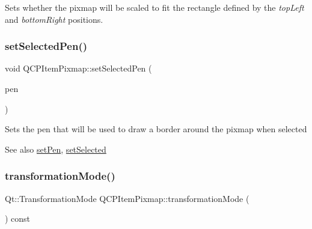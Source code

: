 Sets whether the pixmap will be scaled to fit the rectangle defined by the {\itshape top\+Left} and {\itshape bottom\+Right} positions. \mbox{\label{class_q_c_p_item_pixmap_afc5e479e88e53740176ce77cb70dd67a}} 
\subsubsection{\texorpdfstring{set\+Selected\+Pen()}{setSelectedPen()}}
{\footnotesize\ttfamily void Q\+C\+P\+Item\+Pixmap\+::set\+Selected\+Pen (\begin{DoxyParamCaption}\item[{const Q\+Pen \&}]{pen }\end{DoxyParamCaption})}

Sets the pen that will be used to draw a border around the pixmap when selected

\begin{DoxySeeAlso}{See also}
\hyperlink{class_q_c_p_item_pixmap_acdade1305edb4b5cae14f97fd132065f}{set\+Pen}, \hyperlink{class_q_c_p_abstract_item_a203de94ad586cc44d16c9565f49d3378}{set\+Selected} 
\end{DoxySeeAlso}
\mbox{\label{class_q_c_p_item_pixmap_ab963aa9693d49c323948f2820a5785b6}} 
\subsubsection{\texorpdfstring{transformation\+Mode()}{transformationMode()}}
{\footnotesize\ttfamily Qt\+::\+Transformation\+Mode Q\+C\+P\+Item\+Pixmap\+::transformation\+Mode (\begin{DoxyParamCaption}{ }\end{DoxyParamCaption}) const\hspace{0.3cm}{\ttfamily [inline]}}

\mbox{\label{class_q_c_p_item_pixmap_a8bced3027b326b290726cd1979c7cfc6}} 
